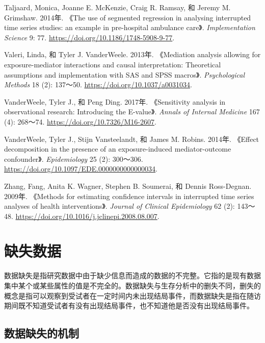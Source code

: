 \documentclass[
  chinese-hans,
  letterpaper,
  DIV=11,
  numbers=noendperiod]{scrreprt}
\newlength{\cslhangindent}
\newenvironment{CSLReferences}[2] %
 {\begin{list}{}{%
  \setlength{\itemindent}{0pt}
  \setlength{\leftmargin}{0pt}
  \setlength{\parsep}{0pt}
  \ifodd #1
   \setlength{\leftmargin}{\cslhangindent}
   \setlength{\itemindent}{-1\cslhangindent}
  \fi
  \setlength{\itemsep}{#2\baselineskip}}}
 {\end{list}}
\begin{document}
\begin{CSLReferences}{1}{1}
Taljaard, Monica, Joanne E. McKenzie, Craig R. Ramsay, 和 Jeremy M.
Grimshaw. 2014年. {《The use of segmented regression in analysing
interrupted time series studies: an example in pre-hospital ambulance
care》}. \emph{Implementation Science} 9: 77.
\url{https://doi.org/10.1186/1748-5908-9-77}.

Valeri, Linda, 和 Tyler J. VanderWeele. 2013年. {《Mediation analysis
allowing for exposure-mediator interactions and causal interpretation:
Theoretical assumptions and implementation with {SAS} and {SPSS}
macros》}. \emph{Psychological Methods} 18 (2): 137～50.
\url{https://doi.org/10.1037/a0031034}.

VanderWeele, Tyler J., 和 Peng Ding. 2017年. {《Sensitivity analysis in
observational research: Introducing the {E}-value》}. \emph{Annals of
Internal Medicine} 167 (4): 268～74.
\url{https://doi.org/10.7326/M16-2607}.

VanderWeele, Tyler J., Stijn Vansteelandt, 和 James M. Robins. 2014年.
{《Effect decomposition in the presence of an exposure-induced
mediator-outcome confounder》}. \emph{Epidemiology} 25 (2): 300～306.
\url{https://doi.org/10.1097/EDE.0000000000000034}.

Zhang, Fang, Anita K. Wagner, Stephen B. Soumerai, 和 Dennis
Ross-Degnan. 2009年. {《Methods for estimating confidence intervals in
interrupted time series analyses of health interventions》}.
\emph{Journal of Clinical Epidemiology} 62 (2): 143～48.
\url{https://doi.org/10.1016/j.jclinepi.2008.08.007}.

\end{CSLReferences}


\chapter{缺失数据}\label{ux7f3aux5931ux6570ux636e}

数据缺失是指研究数据中由于缺少信息而造成的数据的不完整。它指的是现有数据集中某个或某些属性的值是不完全的。数据缺失与生存分析中的删失不同，删失的概念是指可以观察到受试者在一定时间内未出现结局事件，而数据缺失是指在随访期间既不知道受试者有没有出现结局事件，也不知道他是否没有出现结局事件。

\section{数据缺失的机制}\label{ux6570ux636eux7f3aux5931ux7684ux673aux5236}
\end{document}

